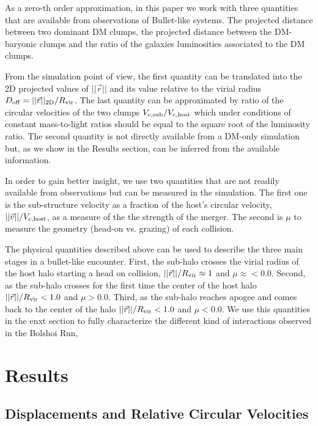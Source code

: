 \documentclass{emulateapj}
\begin{document}
As a zero-th order approximation, in this paper we work with three
quantities that are available from observations of Bullet-like
systems. The projected distance between two dominant DM clumps, the
projected distance between the DM-baryonic clumps and the ratio of the galaxies
luminosities associated to the DM clumps. 

From the simulation point of view, the first quantity can be
translated into the 2D projected values of $||\vec{r}||$ and its value
relative to the virial radius $D_{\rm   off}= ||\vec{r}||_{\rm
  2D}/R_{\rm vir}$. The last quantity can be approximated by ratio of
the circular velocities of the two clumps $V_{\rm c,sub}/V_{\rm
  c,host}$ which under conditions of constant mass-to-light ratios
should be equal to the square root of the luminosity ratio. The second
quantity is not directly available from a DM-only simulation but, as we
show in the Results section, can be  inferred from the available
information. 


In order to gain better insight, we use two
quantities that are not readily available from observations but can be
measured in the simulation. The first one is the sub-structure
velocity as a fraction of the host's circular velocity, $||\vec{v}||/V_{\rm c, host}$, as a measure of the the strength of the
merger.  The second is $\mu$ to measure the geometry (head-on
vs. grazing) of each collision.


The physical quantities described above can be used to describe
the three main stages in a bullet-like encounter. First, the sub-halo
crosses the virial radius of the host halo starting a head on
collision, $||\vec{r}||/R_{\rm vir}\approx 1$ and
$\mu\approx<0.0$. Second, as the sub-halo crosses for the first time
the center of the host halo $||\vec{r}||/R_{\rm vir} < 1.0$ and
$\mu>0.0$. Third, as the sub-halo reaches apogee and comes back to the
center of the halo $||\vec{r}||/R_{\rm vir} < 1.0$ and $\mu<0.0$. We use
this quantities in the enxt section to fully characterize the different
kind of interactions observed in the Bolshoi Run,


\section{Results}
\label{sec:results}

\subsection{Displacements and Relative Circular Velocities}
\label{fig:displacement}
\end{document}

